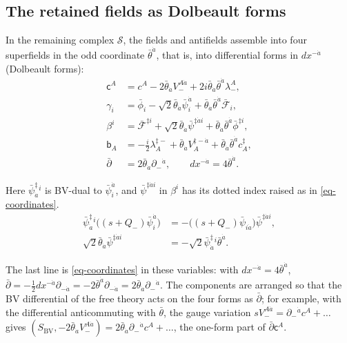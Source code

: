 \documentclass[11pt]{article}
\numberwithin{equation}{section}
\numberwithin{figure}{section}
\numberwithin{table}{section}
\begin{document}
\subsection{The retained fields as Dolbeault forms}\label{the-retained-fields}

In the remaining complex $\mathcal S$, the fields and antifields assemble into four superfields in the odd coordinate $\bar\theta^{\dot a}$, that is, into differential forms in $dx^{-\dot a}$ (Dolbeault forms):
\begin{equation}\label{eq-B-7}
\begin{aligned}
\mathsf c^A&=c^A-2\bar\theta_{\dot a}V_-^{A\dot a}
+2i\bar\theta_{\dot a}\bar\theta^{\dot a}\lambda_-^A,\\
\gamma_i&=\bar\phi_i-\sqrt2\bar\theta_{\dot a}\bar\psi_i^{\dot a}
+\bar\theta_{\dot a}\bar\theta^{\dot a}\bar{\mathcal F}_i,\\
\beta^i&=\bar{\mathcal F}^{\ddagger i}
+\sqrt2\bar\theta_{\dot a}\bar\psi^{\ddagger\dot ai}
+\bar\theta_{\dot a}\bar\theta^{\dot a}\bar\phi^{\ddagger i},\\
\mathsf b_A&=-\frac i2\lambda_A^{\ddagger-}
+\bar\theta_{\dot a}V_A^{\ddagger-\dot a}
+\bar\theta_{\dot a}\bar\theta^{\dot a}c_A^{\ddagger},\\
\bar\partial&=2\bar\theta_{\dot a}\partial_-{}^{\dot a},
\qquad dx^{-\dot a}=4\bar\theta^{\dot a}.
\end{aligned}
\end{equation}

\begin{proofbox}
Here $\bar\psi^\ddagger_{\dot a}{}^i$ is BV-dual to $\bar\psi_i^{\dot a}$, and $\bar\psi^{\ddagger\dot a i}$ in $\beta^i$ has its dotted index raised as in \eqref{eq-coordinates}.
\begin{equation*}
\begin{aligned}
\bar\psi^\ddagger_{\dot a}{}^i
\bigl((s+Q_-)\bar\psi_i^{\dot a}\bigr)
&=-\bigl((s+Q_-)\bar\psi_{i\dot a}\bigr)
\bar\psi^{\ddagger\dot a i},\\
\sqrt2\bar\theta_{\dot a}\bar\psi^{\ddagger\dot a i}
&=-\sqrt2\bar\psi^\ddagger_{\dot a}{}^i\bar\theta^{\dot a}.
\end{aligned}
\end{equation*}
\end{proofbox}

The last line is \eqref{eq-coordinates} in these variables: with $dx^{-\dot a}=4\bar\theta^{\dot a}$, $\bar\partial=-\frac12dx^{-\dot a}\partial_{-\dot a}=-2\bar\theta^{\dot a}\partial_{-\dot a}=2\bar\theta_{\dot a}\partial_-{}^{\dot a}$. The components are arranged so that the BV differential of the free theory acts on the four forms as $\bar\partial$; for example, with the differential anticommuting with $\bar\theta$, the gauge variation $sV_-^{A\dot a}=\partial_-{}^{\dot a}c^A+\ldots$ gives $(S_{\mathrm{BV}},-2\bar\theta_{\dot a}V_-^{A\dot a})=2\bar\theta_{\dot a}\partial_-{}^{\dot a}c^A+\ldots$, the one-form part of $\bar\partial\mathsf c^A$.
\end{document}
